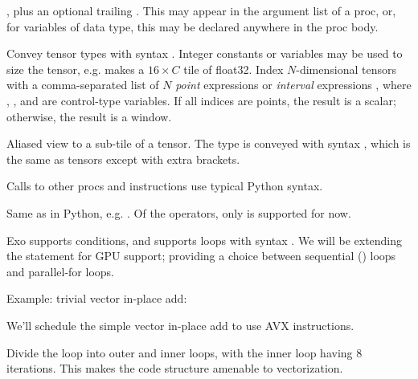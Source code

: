 \filbreak
{}

 , plus an optional trailing .
    This may appear in the argument list of a proc, or, for variables of data type, this may be declared anywhere in the proc body.

\filbreak
{} Convey tensor types with syntax .
Integer constants or  variables may be used to size the tensor, e.g. {} makes  a $16 \times C$ tile of float32.
Index $N$-dimensional tensors with a comma-separated list of $N$ \textit{point} expressions  or \textit{interval} expressions , where , , and  are control-type variables.
If all indices are points, the result is a scalar; otherwise, the result is a window.

\filbreak
{} Aliased view to a sub-tile of a tensor.
The type is conveyed with syntax , which is the same as tensors except with extra brackets.

\filbreak
{} Calls to other procs and instructions use typical Python syntax.

\filbreak
{} Same as in Python, e.g. .
Of the  operators, only \lighttt{+=} is supported for now.

\filbreak
{} Exo supports  conditions, and supports  loops with syntax .
We will be extending the  statement for GPU support; providing a choice between sequential () loops and parallel-for loops.

\filbreak
Example: trivial vector in-place add:



\filbreak
{}

We'll schedule the simple vector in-place add to use AVX instructions.

\filbreak
{}

Divide the  loop into outer  and inner  loops, with the inner loop having 8 iterations.
This makes the code structure amenable to vectorization.

